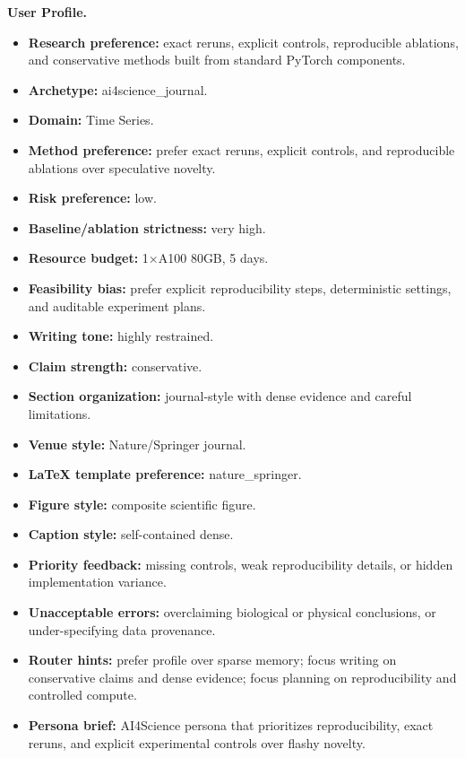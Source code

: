 \documentclass{opendatalab}
\begin{document}
\begin{tcolorbox}[
  breakable,
  colback=blue!3,
  colframe=blue!50!black,
  boxrule=0.5pt,
  arc=2pt,
  left=6pt, right=6pt, top=6pt, bottom=6pt,
  title=\textbf{Profile A: Evidence-First Journal Scientist},
  fonttitle=\small\bfseries
]
\small
\textbf{User Profile.}
\begin{itemize}\setlength\itemsep{1pt}
  \item \textbf{Research preference:} exact reruns, explicit controls, reproducible ablations, and conservative methods built from standard PyTorch components.
  \item \textbf{Archetype:} ai4science\_journal.
  \item \textbf{Domain:} Time Series.
  \item \textbf{Method preference:} prefer exact reruns, explicit controls, and reproducible ablations over speculative novelty.
  \item \textbf{Risk preference:} low.
  \item \textbf{Baseline/ablation strictness:} very high.
  \item \textbf{Resource budget:} 1$\times$A100 80GB, 5 days.
  \item \textbf{Feasibility bias:} prefer explicit reproducibility steps, deterministic settings, and auditable experiment plans.
  \item \textbf{Writing tone:} highly restrained.
  \item \textbf{Claim strength:} conservative.
  \item \textbf{Section organization:} journal-style with dense evidence and careful limitations.
  \item \textbf{Venue style:} Nature/Springer journal.
  \item \textbf{LaTeX template preference:} nature\_springer.
  \item \textbf{Figure style:} composite scientific figure.
  \item \textbf{Caption style:} self-contained dense.
  \item \textbf{Priority feedback:} missing controls, weak reproducibility details, or hidden implementation variance.
  \item \textbf{Unacceptable errors:} overclaiming biological or physical conclusions, or under-specifying data provenance.
  \item \textbf{Router hints:} prefer profile over sparse memory; focus writing on conservative claims and dense evidence; focus planning on reproducibility and controlled compute.
  \item \textbf{Persona brief:} AI4Science persona that prioritizes reproducibility, exact reruns, and explicit experimental controls over flashy novelty.
\end{itemize}


\end{tcolorbox}
\end{document}

